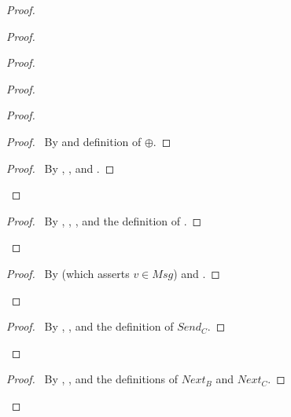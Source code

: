 \documentclass[fleqn,leqno]{article}
\begin{document}
\begin{proof}
\begin{proof}
\begin{proof}
\begin{proof}
\begin{proof}
          \begin{proof}
          \pf\ By  and definition of $\oplus$.
          \end{proof}
        \qedstep{}
          \begin{proof}
          \pf\ By , , and .
          \end{proof}
       \end{proof}
     \qedstep{}
       \begin{proof}
       \pf\ By , , , 
        and the definition of .
       \end{proof}
     \end{proof}
    \qedstep{}
      \begin{proof}
      \pf\ By  (which asserts $v \in Msg$) and
       .
      \end{proof}
   \end{proof}
  \qedstep{}
    \begin{proof}
    \pf\ By , , and the
     definition of $Send_{C}$.
    \end{proof}
  \end{proof}
\vspace{.5\baselineskip}%

\vspace{.5\baselineskip}%
\qedstep
\vspace{.2\baselineskip}%
\begin{proof}
\pf\ By , , and the definitions of $Next_{B}$
and $Next_{C}$.
\end{proof}
\end{proof}
\end{document}
